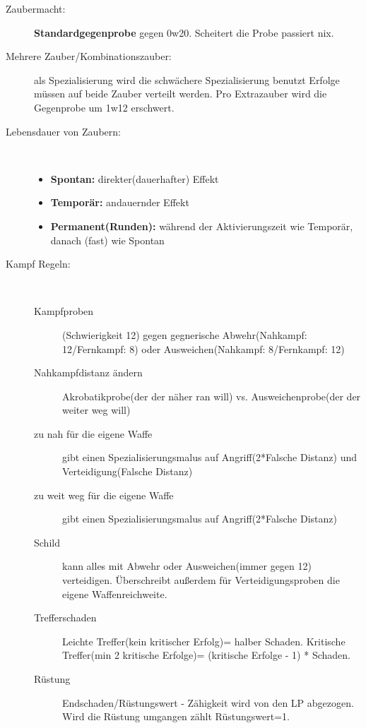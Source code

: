 \begin{landscape}
\begin{center}
\begin{minipage}[t]{0.45\paperheight}
\begin{description}
\begin{description}
	\item[Zaubermacht:] \textbf{Standardgegenprobe} gegen 0w20. Scheitert die Probe passiert nix.

	\item[Mehrere Zauber/Kombinationszauber:] als Spezialisierung wird die schwächere Spezialisierung benutzt Erfolge müssen auf beide Zauber verteilt werden. Pro Extrazauber wird die Gegenprobe um 1w12 erschwert.

	\item[Lebensdauer von Zaubern:]\
	 \begin{itemize}
		\item \textbf{Spontan:} direkter(dauerhafter) Effekt
		\item \textbf{Temporär:} andauernder Effekt
		\item \textbf{Permanent(Runden):} während der Aktivierungszeit wie Temporär, danach (fast) wie Spontan
	\end{itemize}
	\end{description}
\end{description}
\end{minipage}\hfill \begin{minipage}[t]{0.45\paperheight}
\begin{description}
\item[Kampf Regeln:]\ 
	\begin{description}
	\item[Kampfproben](Schwierigkeit 12) gegen gegnerische Abwehr(Nahkampf: 12/Fernkampf: 8) oder Ausweichen(Nahkampf: 8/Fernkampf: 12)
	\item[Nahkampfdistanz ändern] Akrobatikprobe(der der näher ran will) vs. Ausweichenprobe(der der weiter weg will)
	\item[zu nah für die eigene Waffe] gibt einen Spezialisierungsmalus auf Angriff(2*Falsche Distanz) und Verteidigung(Falsche Distanz)
	\item[zu weit weg für die eigene Waffe] gibt einen Spezialisierungsmalus auf Angriff(2*Falsche Distanz)
	\item[Schild] kann alles mit Abwehr oder Ausweichen(immer gegen 12) verteidigen. Überschreibt außerdem für Verteidigungsproben die eigene Waffenreichweite.
	\item[Trefferschaden] Leichte Treffer(kein kritischer Erfolg)= halber Schaden. Kritische Treffer(min 2 kritische Erfolge)= (kritische Erfolge - 1) * Schaden. 
	\item[Rüstung] Endschaden/Rüstungswert - Zähigkeit wird von den LP abgezogen. Wird die Rüstung umgangen zählt Rüstungswert=1.
	\end{description}	
\end{description}
\end{minipage}

\end{center}
\end{landscape}
\restoregeometry
